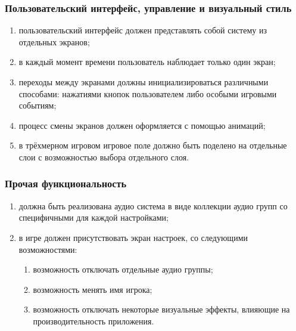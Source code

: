 \subsubsection{Пользовательский интерфейс, управление и визуальный стиль}

\begin{enumerate}
    \item пользовательский интерфейс должен представлять собой систему из отдельных экранов;
    \item в каждый момент времени пользователь наблюдает только один экран;
    \item переходы между экранами должны инициализироваться различными способами: нажатиями кнопок пользователем либо особыми игровыми событиям;
    \item процесс смены экранов должен оформляется с помощью анимаций;
    \item в трёхмерном игровом игровое поле должно быть поделено на отдельные слои с возможностью выбора отдельного слоя.
\end{enumerate}


\subsubsection{Прочая функциональность}

\begin{enumerate}
    \item должна быть реализована аудио система в виде коллекции аудио групп со специфичными для каждой настройками;
    \item в игре должен присутствовать экран настроек, со следующими возможностями:
    \begin{enumerate}
        \item возможность отключать отдельные аудио группы;
        \item возможность менять имя игрока;
        \item возможность отключать некоторые визуальные эффекты, влияющие на производительность приложения.
    \end{enumerate}
\end{enumerate}